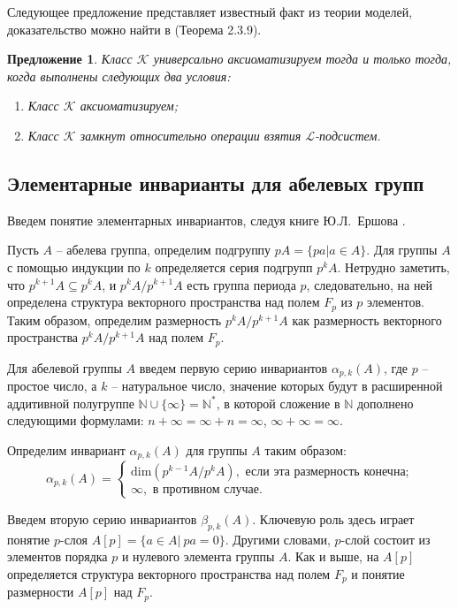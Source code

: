 \documentclass[a4paper,11pt,twoside]{article}
\newtheorem{proposition}{Предложение}[section]
\def\K{{\mathcal{K}}}
\def\L{{\mathcal{L}}}
\def\N{{\mathbb{N}}}
\begin{document}
Следующее предложение представляет известный факт из теории моделей, доказательство можно найти в \cite{DM} (Теорема 2.3.9).
\begin{proposition}\label{prop:AxiomClass2}
Класс $\K$ универсально аксиоматизируем тогда и только тогда, когда выполнены следующих два условия:
\begin{enumerate}
\item Класс $\K$ аксиоматизируем;
\item Класс $\K$ замкнут относительно операции взятия $\L$-подсистем.
\end{enumerate}
\end{proposition}



\subsection{Элементарные инварианты для абелевых групп}\label{sec:UnivInvariants}

Введем понятие элементарных инвариантов, следуя книге Ю.Л.~Ершова \cite{Ershov}.

Пусть $A$ -- абелева группа, определим подгруппу $pA = \{ pa | a \in A\}$. Для группы $A$ с помощью индукции по $k$ определяется серия подгрупп $p^k A$. Нетрудно заметить, что $p^{k+1} A \subseteq p^k A$, и $p^k A \Big/ p^{k+1} A$ есть группа периода $p$, следовательно, на ней определена структура векторного пространства над полем $F_p$ из $p$ элементов. Таким образом, определим размерность $p^k A \Big/ p^{k+1} A$ как размерность векторного пространства $p^k A \Big/ p^{k+1} A$ над полем $F_p$.

Для абелевой группы $A$ введем первую серию инвариантов $\alpha_{p,k}(A)$, где $p$ -- простое число, а $k$ -- натуральное число, значение которых будут в расширенной аддитивной полугруппе $\N \cup \{\infty \} = \N^*$, в которой сложение в $\N$ дополнено следующими формулами: $n + \infty = \infty + n = \infty$, $\infty + \infty = \infty$.

Определим инвариант $\alpha_{p,k}(A)$ для группы $A$ таким образом:
$$\alpha_{p,k}(A) = \left\lbrace 
\begin{array}{l}  
\mathrm{dim} \left( p^{k-1}A \Big/ p^k A \right), \text{ если эта размерность конечна;} \\ 
\infty, \text{ в противном случае.}
\end{array} 
\right.$$

Введем вторую серию инвариантов $\beta_{p,k}(A)$. Ключевую роль здесь играет понятие $p$-слоя $A[p] = \{a \in A | \ pa = 0\}$. Другими словами, $p$-слой состоит из элементов порядка $p$ и нулевого элемента группы $A$. Как и выше, на $A[p]$ определяется структура векторного пространства над полем $F_p$ и понятие размерности $A[p]$ над $F_p$.
\end{document}
